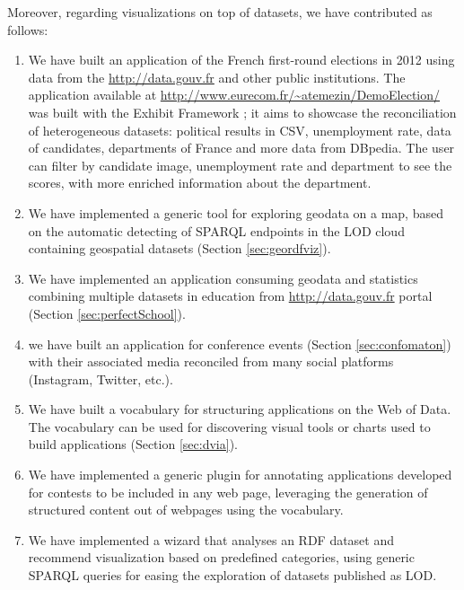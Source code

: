 \documentclass[a4paper,11pt,twoside]{report}
\begin{document}
Moreover, regarding visualizations on top of datasets, we have contributed as follows:
\begin{enumerate}


\item We have built an application of the French first-round elections in 2012 using data from the \url{http://data.gouv.fr} and other public institutions. The application available at \url{http://www.eurecom.fr/~atemezin/DemoElection/} was built with the Exhibit Framework \cite{exhibit2007}; it aims to showcase the reconciliation of heterogeneous datasets: political results in CSV, unemployment rate, data of candidates, departments of France and more data from DBpedia. The user can filter by candidate image, unemployment rate and department to see the scores, with more enriched information about the department.
 
\item We have implemented a generic tool for exploring geodata on a map, based on the automatic detecting of SPARQL endpoints in the LOD cloud containing geospatial datasets (Section \ref{sec:geordfviz}). 

\item We have implemented an application consuming geodata and statistics combining multiple datasets in education from \url{http://data.gouv.fr} portal (Section \ref{sec:perfectSchool}).

\item we have built an application for conference events (Section \ref{sec:confomaton}) with their associated media reconciled from many social platforms (Instagram, Twitter, etc.).

\item We have built a vocabulary for structuring applications on the Web of Data. The vocabulary can be used for discovering visual tools or charts used to build applications (Section \ref{sec:dvia}). 

\item We have implemented a generic plugin for annotating applications developed for contests to be included in any web page, leveraging  the generation of structured content out of webpages using the vocabulary. 


\item We have implemented a wizard that analyses an RDF dataset and recommend visualization based on predefined categories, using generic SPARQL queries for easing the exploration of datasets published as LOD. 


\end{enumerate}
\end{document}
